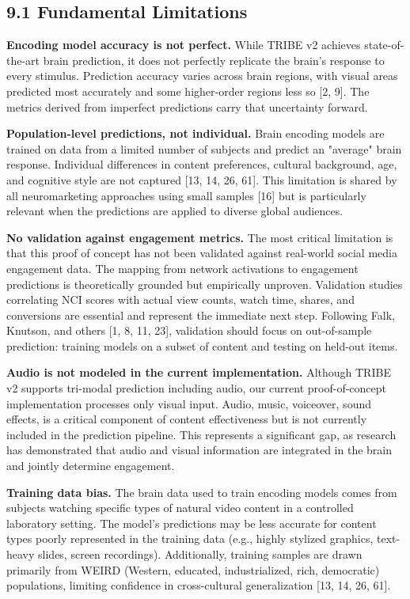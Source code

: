 \documentclass[11pt,letterpaper]{article}
\begin{document}
\subsection{9.1 Fundamental Limitations}

\textbf{Encoding model accuracy is not perfect.} While TRIBE v2 achieves state-of-the-art brain prediction, it does not perfectly replicate the brain's response to every stimulus. Prediction accuracy varies across brain regions, with visual areas predicted most accurately and some higher-order regions less so [2, 9]. The metrics derived from imperfect predictions carry that uncertainty forward.

\textbf{Population-level predictions, not individual.} Brain encoding models are trained on data from a limited number of subjects and predict an "average" brain response. Individual differences in content preferences, cultural background, age, and cognitive style are not captured [13, 14, 26, 61]. This limitation is shared by all neuromarketing approaches using small samples [16] but is particularly relevant when the predictions are applied to diverse global audiences.

\textbf{No validation against engagement metrics.} The most critical limitation is that this proof of concept has not been validated against real-world social media engagement data. The mapping from network activations to engagement predictions is theoretically grounded but empirically unproven. Validation studies correlating NCI scores with actual view counts, watch time, shares, and conversions are essential and represent the immediate next step. Following Falk, Knutson, and others [1, 8, 11, 23], validation should focus on out-of-sample prediction: training models on a subset of content and testing on held-out items.

\textbf{Audio is not modeled in the current implementation.} Although TRIBE v2 supports tri-modal prediction including audio, our current proof-of-concept implementation processes only visual input. Audio, music, voiceover, sound effects, is a critical component of content effectiveness but is not currently included in the prediction pipeline. This represents a significant gap, as research has demonstrated that audio and visual information are integrated in the brain and jointly determine engagement.

\textbf{Training data bias.} The brain data used to train encoding models comes from subjects watching specific types of natural video content in a controlled laboratory setting. The model's predictions may be less accurate for content types poorly represented in the training data (e.g., highly stylized graphics, text-heavy slides, screen recordings). Additionally, training samples are drawn primarily from WEIRD (Western, educated, industrialized, rich, democratic) populations, limiting confidence in cross-cultural generalization [13, 14, 26, 61].
\end{document}
